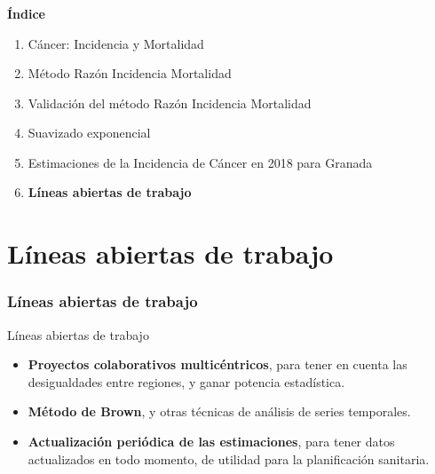 \documentclass{beamer}
\begin{document}

\begin{frame}\frametitle{}

\Large{\textbf{Índice}}\\[2ex]
\normalsize
\begin{enumerate}
	\item Cáncer: Incidencia y Mortalidad \\[2ex]
	\item Método Razón Incidencia Mortalidad \\[2ex]
	\item Validación del método Razón Incidencia Mortalidad \\[2ex]
	\item Suavizado exponencial \\[2ex]
	\item Estimaciones de la Incidencia de Cáncer en 2018 para Granada \\[2ex]
	\item \textbf{Líneas abiertas de trabajo}
\end{enumerate}

\end{frame}

\section{Líneas abiertas de trabajo}
\begin{frame}\frametitle{Líneas abiertas de trabajo}

	\begin{block}{Líneas abiertas de trabajo}
		\begin{itemize}
			\item \textbf{Proyectos colaborativos multicéntricos}, para tener en cuenta las desigualdades entre regiones, y ganar potencia estadística. \\[2ex]
			\item \textbf{Método de Brown}, y otras técnicas de análisis de series temporales. \\[2ex]
			\item \textbf{Actualización periódica de las estimaciones}, para tener datos actualizados en todo momento, de utilidad para la planificación sanitaria.\\[2ex]
		\end{itemize}
	\end{block}

\end{frame}
\end{document}
